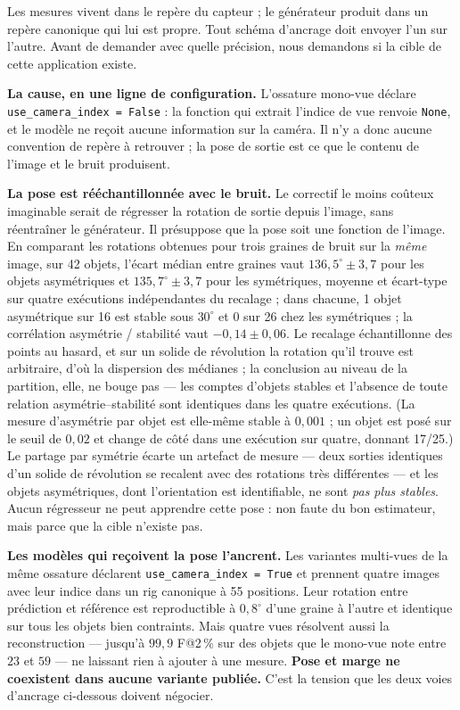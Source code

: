 \documentclass[conference]{IEEEtran}
\makeatletter
\newcommand{\Fs}{F@2\,\%}
\makeatother
\begin{document}
Les mesures vivent dans le repère du capteur ; le générateur produit dans un repère
canonique qui lui est propre. Tout schéma d'ancrage doit envoyer l'un sur l'autre.
Avant de demander avec quelle précision, nous demandons si la cible de cette
application existe.

\textbf{La cause, en une ligne de configuration.} L'ossature mono-vue déclare
\texttt{use\_camera\_index = False} : la fonction qui extrait l'indice de vue renvoie
\texttt{None}, et le modèle ne reçoit aucune information sur la caméra. Il n'y a donc
aucune convention de repère à retrouver ; la pose de sortie est ce que le contenu de
l'image et le bruit produisent.

\textbf{La pose est rééchantillonnée avec le bruit.} Le correctif le moins coûteux
imaginable serait de régresser la rotation de sortie depuis l'image, sans réentraîner
le générateur. Il présuppose que la pose soit une fonction de l'image. En comparant les
rotations obtenues pour trois graines de bruit sur la \emph{même} image, sur 42
objets, l'écart médian entre graines vaut $136{,}5^\circ \pm 3{,}7$ pour les objets
asymétriques et $135{,}7^\circ \pm 3{,}7$ pour les symétriques, moyenne et écart-type
sur quatre exécutions indépendantes du recalage ; dans chacune, 1 objet asymétrique sur
16 est stable sous $30^\circ$ et 0 sur 26 chez les symétriques ; la corrélation
asymétrie / stabilité vaut $-0{,}14 \pm 0{,}06$. Le recalage échantillonne des points
au hasard, et sur un solide de révolution la rotation qu'il trouve est arbitraire,
d'où la dispersion des médianes ; la conclusion au niveau de la partition, elle, ne
bouge pas --- les comptes d'objets stables et l'absence de toute relation
asymétrie--stabilité sont identiques dans les quatre exécutions. (La mesure
d'asymétrie par objet est elle-même stable à $0{,}001$ ; un objet est posé sur le seuil
de $0{,}02$ et change de côté dans une exécution sur quatre, donnant 17/25.) Le partage par symétrie écarte un artefact de mesure --- deux sorties
identiques d'un solide de révolution se recalent avec des rotations très différentes
--- et les objets asymétriques, dont l'orientation est identifiable, ne sont \emph{pas
plus stables}. Aucun régresseur ne peut apprendre cette pose : non faute du bon
estimateur, mais parce que la cible n'existe pas.

\textbf{Les modèles qui reçoivent la pose l'ancrent.} Les variantes multi-vues de la
même ossature déclarent \texttt{use\_camera\_index = True} et prennent quatre images
avec leur indice dans un rig canonique à 55 positions. Leur rotation entre prédiction
et référence est reproductible à $0{,}8^\circ$ d'une graine à l'autre et identique sur
tous les objets bien contraints. Mais quatre vues résolvent aussi la reconstruction
--- jusqu'à $99{,}9$ \Fs{} sur des objets que le mono-vue note entre $23$ et $59$ ---
ne laissant rien à ajouter à une mesure. \textbf{Pose et marge ne coexistent dans
aucune variante publiée.} C'est la tension que les deux voies d'ancrage ci-dessous
doivent négocier.
\end{document}
